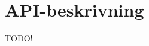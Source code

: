 \documentclass[swedish]{kththesis}
\begin{document}



\printbibliography[heading=bibintoc] %

\appendix

\chapter{API-beskrivning}
\label{appendix:api-beskrivning}
TODO!
\end{document}
